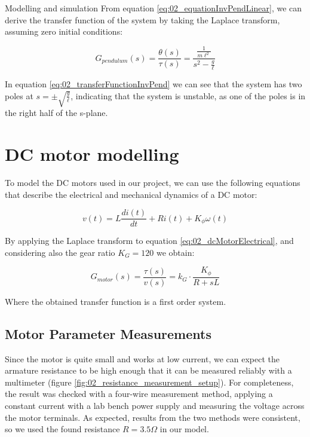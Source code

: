 \begin{chapter}{Modelling and simulation}
\noindent
From equation \ref{eq:02_equationInvPendLinear}, we can derive the transfer function of the system by taking 
the Laplace transform, assuming zero initial conditions:

\begin{equation}
    G_{pendulum}(s) = \frac{\theta(s)}{\tau(s)} = \frac{ \frac{1}{m \ell ^2} }{s^2 - \frac{g}{\ell}}
\label{eq:02_transferFunctionInvPend}
\end{equation}

\noindent
In equation \ref{eq:02_transferFunctionInvPend} we can see that the system has 
two poles at $s = \pm \sqrt{\frac{g}{\ell}}$, indicating that the system is unstable, as one of the poles is in the right half of the s-plane.

\section{DC motor modelling}

To model the DC motors used in our project, we can use the following equations that describe the electrical and mechanical dynamics of a DC motor:

\begin{equation}
    v(t) = L \frac{di(t)}{dt} + R i(t) + K_{\phi} \omega(t)
\label{eq:02_dcMotorElectrical}
\end{equation}

\noindent
By applying the Laplace transform to equation \ref{eq:02_dcMotorElectrical}, and
considering also the gear ratio $K_G = 120$ we obtain:

\begin{equation}
   G_{motor}(s) = \frac{\tau(s)}{v(s)}  = k_G \cdot \frac{K_\phi}{R + sL}
\end{equation}
\label{eq:02_dcMotorTransferFunction}
\end{chapter}

\noindent
Where the obtained transfer function is a first order system.

\subsection{Motor Parameter Measurements}
Since the motor is quite small and works at low current, we can expect the armature resistance to be high enough that it can be measured reliably with a multimeter (figure \ref{fig:02_resistance_measurement_setup}).
For completeness, the result was checked with a four-wire measurement method, applying a constant current with a lab bench power supply and measuring the voltage across the motor terminals.
As expected, results from the two methods were consistent, so we used the found resistance $ R = 3.5 \Omega $ in our model.

